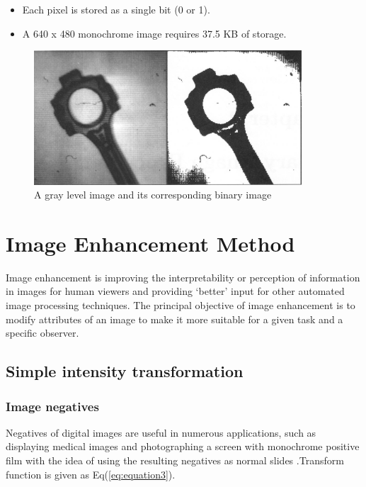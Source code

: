         \begin{itemize}
                \item Each pixel is stored as a single bit (0 or 1).
                \item A 640 x 480 monochrome image requires 37.5 KB of storage.
        \end{itemize}

        \begin{figure}[h]
                \centering
                \includegraphics[width=10cm]{chapiter1/figures/binaire.png}
                \setlength{\fboxrule}{2pt}
                \caption{ A gray level image and its corresponding binary image}
                \label{fig:figure1.7}
        \end{figure}

\section{Image Enhancement Method}\label{sec:image-enhancement-method}
Image enhancement is improving the interpretability or perception of information in images
for human viewers and providing `better' input for other automated image processing techniques.
The principal objective of image enhancement is to modify attributes of an image to make it
more suitable for a given task and a specific observer.

\subsection{Simple intensity transformation}\label{subsec:simple-intensity-transformation}

\subsubsection{Image negatives}
Negatives of digital images are useful in numerous applications,
such as displaying medical images and photographing a screen with monochrome positive
film with the idea of using the resulting negatives as normal slides \cite{1.9}.Transform function is given as Eq(\ref{eq:equation3}).

